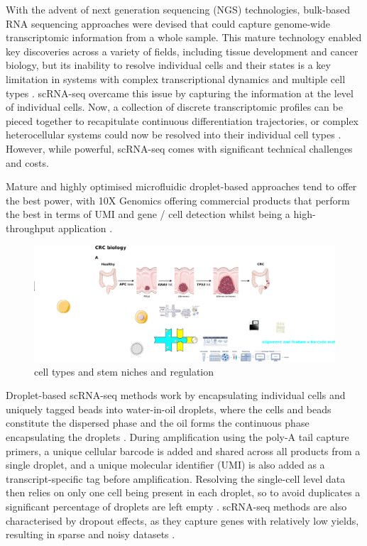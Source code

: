 With the advent of next generation sequencing (NGS) technologies, bulk-based RNA sequencing approaches were devised that could capture genome-wide transcriptomic information from a whole sample. This mature technology enabled key discoveries across a variety of fields, including tissue development and cancer biology, but its inability to resolve individual cells and their states is a key limitation in systems with complex transcriptional dynamics and multiple cell types \cite{li_bulk_2021}.
scRNA-seq overcame this issue by capturing the information at the level of individual cells. Now, a collection of discrete transcriptomic profiles can be pieced together to recapitulate continuous differentiation trajectories, or complex heterocellular systems could now be resolved into their individual cell types \cite{haber_single-cell_2017}. However, while powerful, scRNA-seq comes with significant technical challenges and costs. 

Mature and highly optimised microfluidic droplet-based approaches tend to offer the best power, with 10X Genomics offering commercial products \cite{kitzman_haplotypes_2016} that perform the best in terms of UMI and gene / cell detection whilst being a high-throughput application \cite{ding_systematic_2020}.

\begin{figure}
    \centering
    \includegraphics{01intro/figs/1TECH_scRNAseq.png}
    \caption{cell types and stem niches and regulation}
    \label{fig:fig4}
\end{figure}

Droplet-based scRNA-seq methods work by encapsulating individual cells and uniquely tagged beads into water-in-oil droplets, where the cells and beads constitute the dispersed phase and the oil forms the continuous phase encapsulating the droplets \cite{macosko_highly_2015}. During amplification using the poly-A tail capture primers, a unique cellular barcode is added and shared across all products from a single droplet, and a unique molecular identifier (UMI) is also added as a transcript-specific tag before amplification.
Resolving the single-cell level data then relies on only one cell being present in each droplet, so to avoid duplicates a significant percentage of droplets are left empty \cite{abate_beating_2009}. scRNA-seq methods are also characterised by dropout effects, as they capture genes with relatively low yields, resulting in sparse and noisy datasets \cite{qiu_embracing_2020}. 

